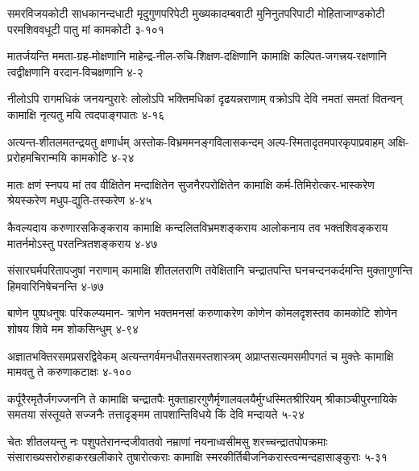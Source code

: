 \annofourlineindentedshloka
{समरविजयकोटी साधकानन्दधाटी}
{मृदुगुणपरिपेटी मुख्यकादम्बवाटी}
{मुनिनुतपरिपाटी मोहिताजाण्डकोटी}
{परमशिववधूटी पातु मां कामकोटी}
{३-१०१}




\annofourlineindentedshloka
{मातर्जयन्ति ममता-ग्रह-मोक्षणानि}
{माहेन्द्र-नील-रुचि-शिक्षण-दक्षिणानि}
{कामाक्षि कल्पित-जगत्त्रय-रक्षणानि}
{त्वद्वीक्षणानि वरदान-विचक्षणानि}
{४-२}

\annofourlineindentedshloka
{नीलोऽपि रागमधिकं जनयन्पुरारेः}
{लोलोऽपि भक्तिमधिकां दृढयन्नराणाम्}
{वक्रोऽपि देवि नमतां समतां वितन्वन्}
{कामाक्षि नृत्यतु मयि त्वदपाङ्गपातः}
{४-१६}

\annofourlineindentedshloka
{अत्यन्त-शीतलमतन्द्रयतु क्षणार्धम्}
{अस्तोक-विभ्रममनङ्गविलासकन्दम्}
{अल्प-स्मितादृतमपारकृपाप्रवाहम्}
{अक्षि-प्ररोहमचिरान्मयि कामकोटि}
{४-२४}


\annofourlineindentedshloka
{मातः क्षणं स्नपय मां तव वीक्षितेन}
{मन्दाक्षितेन सुजनैरपरोक्षितेन}
{कामाक्षि कर्म-तिमिरोत्कर-भास्करेण}
{श्रेयस्करेण मधुप-द्युति-तस्करेण}
{४-४५}

\annofourlineindentedshloka
{कैवल्यदाय करुणारसकिङ्कराय}
{कामाक्षि कन्दलितविभ्रमशङ्कराय}
{आलोकनाय तव भक्तशिवङ्कराय}
{मातर्नमोऽस्तु परतन्त्रितशङ्कराय}
{४-४७}

\annofourlineindentedshloka
{संसारघर्मपरितापजुषां नराणाम्}
{कामाक्षि शीतलतराणि तवेक्षितानि}
{चन्द्रातपन्ति घनचन्दनकर्दमन्ति}
{मुक्तागुणन्ति हिमवारिनिषेचनन्ति}
{४-७७}

\annofourlineindentedshloka
{बाणेन पुष्पधनुषः परिकल्प्यमान-}
{त्राणेन भक्तमनसां करुणाकरेण}
{कोणेन कोमलदृशस्तव कामकोटि}
{शोणेन शोषय शिवे मम शोकसिन्धुम्}
{४-९४}

\annofourlineindentedshloka
{अज्ञातभक्तिरसमप्रसरद्विवेकम्}
{अत्यन्तगर्वमनधीतसमस्तशास्त्रम्}
{अप्राप्तसत्यमसमीपगतं च मुक्तेः}
{कामाक्षि मामवतु ते करुणाकटाक्षः}
{४-१००}%




\annofourlineindentedshloka
{कर्पूरैरमृतैर्जगज्जननि ते कामाक्षि चन्द्रातपैः}
{मुक्ताहारगुणैर्मृणालवलयैर्मुग्धस्मितश्रीरियम्}
{श्रीकाञ्चीपुरनायिके समतया संस्तूयते सज्जनैः}
{तत्तादृङ्मम तापशान्तिविधये किं देवि मन्दायते}
{५-२४}

\annofourlineindentedshloka
{चेतः शीतलयन्तु नः पशुपतेरानन्दजीवातवो}
{नम्राणां नयनाध्वसीमसु शरच्चन्द्रातपोपक्रमाः}
{संसाराख्यसरोरुहाकरखलीकारे तुषारोत्कराः}
{कामाक्षि स्मरकीर्तिबीजनिकरास्त्वन्मन्दहासाङ्कुराः}
{५-३१}

